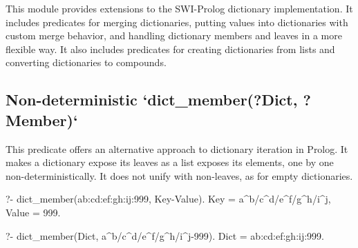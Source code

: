 This module provides extensions to the SWI-Prolog dictionary
implementation. It includes predicates for merging dictionaries,
putting values into dictionaries with custom merge behavior,
and handling dictionary members and leaves in a more flexible way.
It also includes predicates for creating dictionaries from lists
and converting dictionaries to compounds.

\subsection{Non-deterministic `dict_member(?Dict, ?Member)`}

This predicate offers an alternative approach to dictionary iteration in
Prolog. It makes a dictionary expose its leaves as a list exposes its
elements, one by one non-deterministically. It does not unify with
non-leaves, as for empty dictionaries.

\begin{code}
?- dict_member(a{b:c{d:e{f:g{h:i{j:999}}}}}, Key-Value).
Key = a^b/c^d/e^f/g^h/i^j,
Value = 999.

?- dict_member(Dict, a^b/c^d/e^f/g^h/i^j-999).
Dict = a{b:c{d:e{f:g{h:i{j:999}}}}}.
\end{code}

\vspace{0.7cm}

